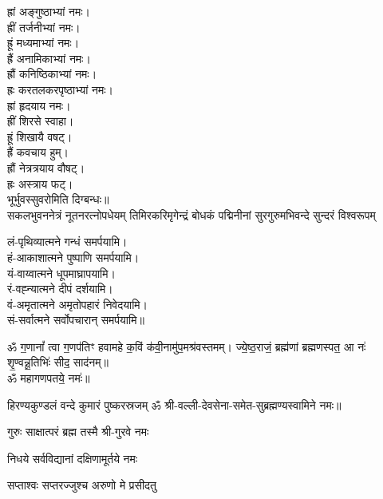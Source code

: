 ह्रां अङ्गुष्ठाभ्यां नमः।\\
ह्रीं तर्जनीभ्यां नमः।\\
ह्रूं मध्यमाभ्यां नमः।\\
ह्रैं अनामिकाभ्यां नमः।\\
ह्रौं कनिष्ठिकाभ्यां नमः।\\
ह्रः करतलकरपृष्ठाभ्यां नमः।\\

ह्रां हृदयाय नमः।\\
ह्रीं शिरसे स्वाहा।\\
ह्रूं शिखायै वषट्।\\
ह्रैं कवचाय हुम्।\\
ह्रौं नेत्रत्रयाय वौषट्।\\
ह्रः अस्त्राय फट्।\\

भूर्भुवस्सुवरोमिति दिग्बन्धः॥\\

{सकलभुवननेत्रं नूतनरत्नोपधेयम्}
{तिमिरकरिमृगेन्द्रं बोधकं पद्मिनीनां}
{सुरगुरुमभिवन्दे सुन्दरं विश्वरूपम्}

लं-पृथिव्यात्मने गन्धं समर्पयामि।\\
हं-आकाशात्मने पुष्पाणि समर्पयामि।\\
यं-वाय्वात्मने धूपमाघ्रापयामि।\\
रं-वह्न्यात्मने दीपं दर्शयामि।\\
वं-अमृतात्मने अमृतोपहारं निवेदयामि।\\
सं-सर्वात्मने सर्वोपचारान् समर्पयामि॥\\


ॐ ग॒णानां᳚ त्वा ग॒णप॑तिꣳ हवामहे क॒विं क॑वी॒नामु॑प॒मश्र॑\-वस्तमम्।
ज्ये॒ष्ठ॒राजं॒ ब्रह्म॑णां ब्रह्मणस्पत॒ आ नः॑ शृ॒ण्वन्नू॒तिभिः॑ सीद॒ साद॑नम्॥\\
ॐ महागणपतये॒ नमः॑॥

{हिरण्यकुण्डलं वन्दे कुमारं पुष्करस्रजम्}
ॐ श्री-वल्ली-देवसेना-समेत-सुब्रह्मण्यस्वामिने नमः॥

{गुरुः साक्षात्परं ब्रह्म तस्मै श्री-गुरवे नमः}

{निधये सर्वविद्यानां दक्षिणामूर्तये नमः}

{सप्ताश्वः सप्तरज्जुश्च अरुणो मे प्रसीदतु}

